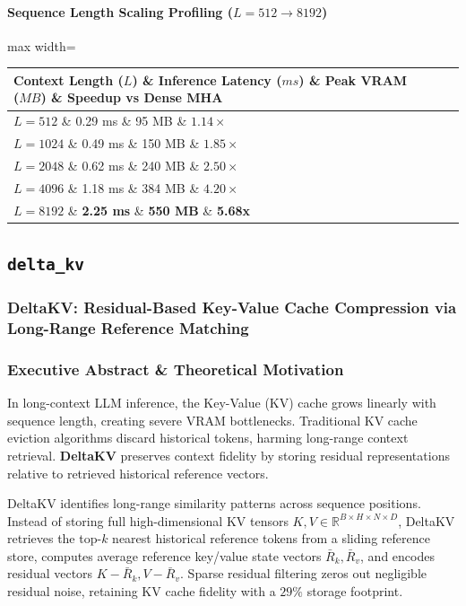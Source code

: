 \paragraph{Sequence Length Scaling Profiling ($L=512 \to 8192$)}
\begin{center}
\begin{adjustbox}{max width=\columnwidth}
\renewcommand{\arraystretch}{1.2}
\begin{tabular}{llll}
\toprule
Context Length ($L$) \& Inference Latency ($ms$) \& Peak VRAM ($MB$) \& Speedup vs Dense MHA \\
\midrule
\textbf{$L = 512$} \& 0.29 ms \& 95 MB \& $1.14\times$ \\
\textbf{$L = 1024$} \& 0.49 ms \& 150 MB \& $1.85\times$ \\
\textbf{$L = 2048$} \& 0.62 ms \& 240 MB \& $2.50\times$ \\
\textbf{$L = 4096$} \& 1.18 ms \& 384 MB \& $4.20\times$ \\
\textbf{$L = 8192$} \& \textbf{2.25 ms} \& \textbf{550 MB} \& \textbf{5.68x} \\


\bottomrule
\end{tabular}
\end{adjustbox}
\end{center}

\subsection{\texttt{delta\_kv}}
\subsubsection*{DeltaKV: Residual-Based Key-Value Cache Compression via Long-Range Reference Matching}

\subsubsection*{Executive Abstract \& Theoretical Motivation}

In long-context LLM inference, the Key-Value (KV) cache grows linearly with sequence length, creating severe VRAM bottlenecks. Traditional KV cache eviction algorithms discard historical tokens, harming long-range context retrieval. \textbf{DeltaKV} preserves context fidelity by storing residual representations relative to retrieved historical reference vectors.

DeltaKV identifies long-range similarity patterns across sequence positions. Instead of storing full high-dimensional KV tensors $K, V \in \mathbb{R}^{B \times H \times N \times D}$, DeltaKV retrieves the top-$k$ nearest historical reference tokens from a sliding reference store, computes average reference key/value state vectors $\bar{R}_k, \bar{R}_v$, and encodes residual vectors $K - \bar{R}_k, V - \bar{R}_v$. Sparse residual filtering zeros out negligible residual noise, retaining KV cache fidelity with a $29\%$ storage footprint.

